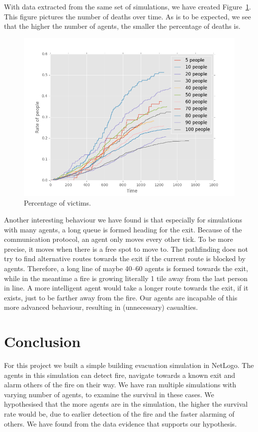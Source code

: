 \documentclass[a4paper]{article}
\begin{document}
With data extracted from the same set of simulations, we have created Figure~\ref{fig:deaths}. This figure pictures the number of deaths over time. As is to be expected, we see that the higher the number of agents, the smaller the percentage of deaths is. 

\begin{figure}[ht]
  \centering
  \includegraphics[width=\linewidth]{deathrate.png}
  \caption{Percentage of victims.}
  \label{fig:deaths}
\end{figure}

Another interesting behaviour we have found is that especially for simulations with many agents, a long queue is formed heading for the exit. Because of the communication protocol, an agent only moves every other tick. To be more precise, it moves when there is a free spot to move to. The pathfinding does not try to find alternative routes towards the exit if the current route is blocked by agents. Therefore, a long line of maybe 40--60 agents is formed towards the exit, while in the meantime a fire is growing literally 1 tile away from the last person in line. A more intelligent agent would take a longer route towards the exit, if it exists, just to be farther away from the fire. Our agents are incapable of this more advanced behaviour, resulting in (unnecessary) casualties. 

\section{Conclusion}
\label{sec:conclusion}
For this project we built a simple building evacuation simulation in NetLogo. The agents in this simulation can detect fire, navigate towards a known exit and alarm others of the fire on their way. We have ran multiple simulations with varying number of agents, to examine the survival in these cases. We hypothesised that the more agents are in the simulation, the higher the survival rate would be, due to earlier detection of the fire and the faster alarming of others. We have found from the data evidence that supports our hypothesis. 
\end{document}
